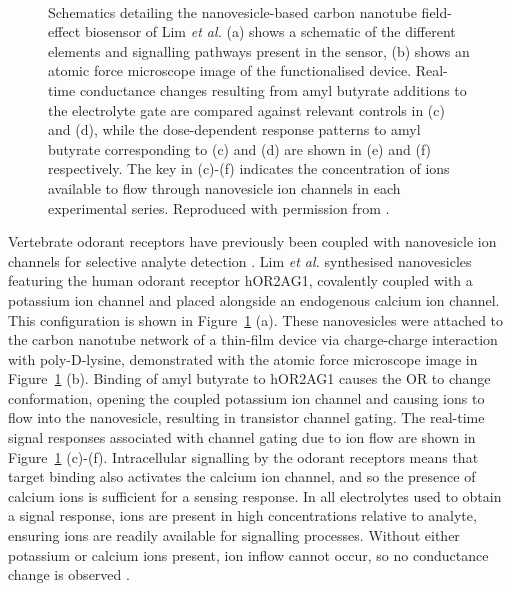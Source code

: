 \documentclass[
  a4paper,
]{scrbook}
\begin{document}
\begin{figure}
\begin{minipage}[t]{0.45\linewidth}
{{}

}

\end{minipage}%
%
\begin{minipage}[t]{0.01\linewidth}

{\centering 

~

}

\end{minipage}%

\caption{\label{fig-lim-ion-channel}Schematics detailing the
nanovesicle-based carbon nanotube field-effect biosensor of Lim \emph{et
al.} (a) shows a schematic of the different elements and signalling
pathways present in the sensor, (b) shows an atomic force microscope
image of the functionalised device. Real-time conductance changes
resulting from amyl butyrate additions to the electrolyte gate are
compared against relevant controls in (c) and (d), while the
dose-dependent response patterns to amyl butyrate corresponding to (c)
and (d) are shown in (e) and (f) respectively. The key in (c)-(f)
indicates the concentration of ions available to flow through
nanovesicle ion channels in each experimental series. Reproduced with
permission from \autocite{Lim2015}.}

\end{figure}

Vertebrate odorant receptors have previously been coupled with
nanovesicle ion channels for selective analyte detection
\autocite{Lim2015,Dung2018}. Lim \emph{et al.} synthesised nanovesicles
featuring the human odorant receptor hOR2AG1, covalently coupled with a
potassium ion channel and placed alongside an endogenous calcium ion
channel. This configuration is shown in Figure~\ref{fig-lim-ion-channel}
(a). These nanovesicles were attached to the carbon nanotube network of
a thin-film device via charge-charge interaction with poly-D-lysine,
demonstrated with the atomic force microscope image in
Figure~\ref{fig-lim-ion-channel} (b). Binding of amyl butyrate to
hOR2AG1 causes the OR to change conformation, opening the coupled
potassium ion channel and causing ions to flow into the nanovesicle,
resulting in transistor channel gating. The real-time signal responses
associated with channel gating due to ion flow are shown in
Figure~\ref{fig-lim-ion-channel} (c)-(f). Intracellular signalling by
the odorant receptors means that target binding also activates the
calcium ion channel, and so the presence of calcium ions is sufficient
for a sensing response. In all electrolytes used to obtain a signal
response, ions are present in high concentrations relative to analyte,
ensuring ions are readily available for signalling processes. Without
either potassium or calcium ions present, ion inflow cannot occur, so no
conductance change is observed \autocite{Lim2015}.
\end{document}
